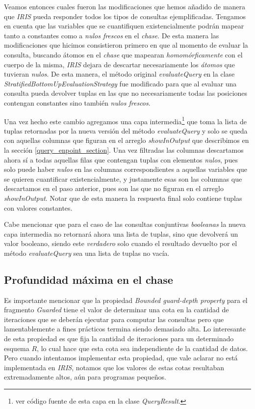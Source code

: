 \documentclass[11pt,a4paper,twoside]{tesis}
\begin{document}
Veamos entonces cuales fueron las modificaciones que hemos añadido de manera que \textit{IRIS} pueda responder todos los tipos de consultas ejemplificadas. Tengamos en cuenta que las variables que se cuantifiquen existencialmente podrán mapear tanto a constantes como a \textit{nulos frescos} en el \textit{chase}. De esta manera las modificaciones que hicimos consistieron primero en que al momento de evaluar la consulta, buscando átomos en el \textit{chase} que mapearan \textit{homomórficamente}   con el cuerpo de la misma, \textit{IRIS} dejara de descartar necesariamente los \textit{átomos} que tuvieran \textit{nulos}. De esta manera, el método original \textit{evaluateQuery} en la clase \textit{StratifiedBottomUpEvaluationStrategy} fue modificado para que al evaluar una consulta pueda devolver tuplas en las que no necesariamente todas las posiciones contengan constantes sino también \textit{nulos frescos}.

Una vez hecho este cambio agregamos una capa intermedia\footnote{ver código fuente de esta capa en la clase \textit{QueryResult}.} que toma la lista de tuplas retornadas por la nueva versión del método \textit{evaluateQuery} y solo se queda con aquellas columnas que figuran en el arreglo \textit{showInOutput} que describimos en la sección \ref{query_enpoint_section}. Una vez filtradas las columnas descartamos ahora sí a todas aquellas filas que contengan tuplas con elementos \textit{nulos}, pues solo puede haber \textit{nulos} en las columnas correspondientes a aquellas variables que se quieren cuantificar existencialmente, y justamente esas son las columnas que descartamos en el paso anterior, pues son las que no figuran en el arreglo \textit{showInOutput}. Notar que de esta manera la respuesta final solo contiene tuplas con valores constantes.

Cabe mencionar que para el caso de las consultas conjuntivas \textit{booleanas} la nueva capa intermedia no retornará ahora una lista de tuplas, sino que devolverá un valor booleano, siendo este \textit{verdadero} solo cuando el resultado devuelto por el método \textit{evaluateQuery} sea una lista de tuplas no vacía.

\subsection{Profundidad máxima en el chase}

Es importante mencionar que la propiedad \textit{Bounded guard-depth property} para el fragmento \textit{Guarded} tiene el valor de determinar una cota en la cantidad de iteraciones que se deberán ejecutar para computar las consultas pero que lamentablemente a fines prácticos termina siendo demasiado alta. Lo interesante de esta propiedad es que fija la cantidad de iteraciones para un determinado esquema $R$, lo cual hace que esta cota sea independiente de la cantidad de datos. Pero cuando intentamos implementar esta propiedad, que vale aclarar no está implementada en  \textit{IRIS}, notamos que los valores de estas cotas resultaban extremadamente altos, aún para programas pequeños. 
\end{document}
